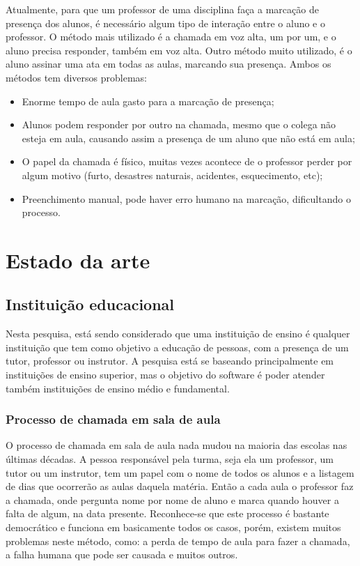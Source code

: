 \documentclass[
	12pt,
	oneside,
	a4paper,
	english,
	brazil,
]{abntex2}
\begin{document}
Atualmente, para que um professor de uma disciplina faça a marcação de presença dos alunos, é necessário algum tipo de interação entre o aluno e o professor. O método mais utilizado é a chamada em voz alta, um por um, e o aluno precisa responder, também em voz alta. Outro método muito utilizado, é o aluno assinar uma ata em todas as aulas, marcando sua presença. Ambos os métodos tem diversos problemas:

\begin{itemize}
    \item Enorme tempo de aula gasto para a marcação de presença;
    \item Alunos podem responder por outro na chamada, mesmo que o colega não esteja em aula, causando assim a presença de um aluno que não está em aula;
    \item O papel da chamada é físico, muitas vezes acontece de o professor perder por algum motivo (furto, desastres naturais, acidentes, esquecimento, etc);
    \item Preenchimento manual, pode haver erro humano na marcação, dificultando o processo.
\end{itemize}



\chapter{Estado da arte}

\section{Instituição educacional}

Nesta pesquisa, está sendo considerado que uma instituição de ensino é qualquer instituição que tem como objetivo a educação de pessoas, com a presença de um tutor, professor ou instrutor. A pesquisa está se baseando principalmente em instituições de ensino superior, mas o objetivo do software é poder atender também instituições de ensino médio e fundamental.

\subsection{Processo de chamada em sala de aula}

O processo de chamada em sala de aula nada mudou na maioria das escolas nas últimas décadas. A pessoa responsável pela turma, seja ela um professor, um tutor ou um instrutor, tem um papel com o nome de todos os alunos e a listagem de dias que ocorrerão as aulas daquela matéria. Então a cada aula o professor faz a chamada, onde pergunta nome por nome de aluno e marca quando houver a falta de algum, na data presente. Reconhece-se que este processo é bastante democrático e funciona em basicamente todos os casos, porém, existem muitos problemas neste método, como: a perda de tempo de aula para fazer a chamada, a falha humana que pode ser causada e muitos outros.
\end{document}
